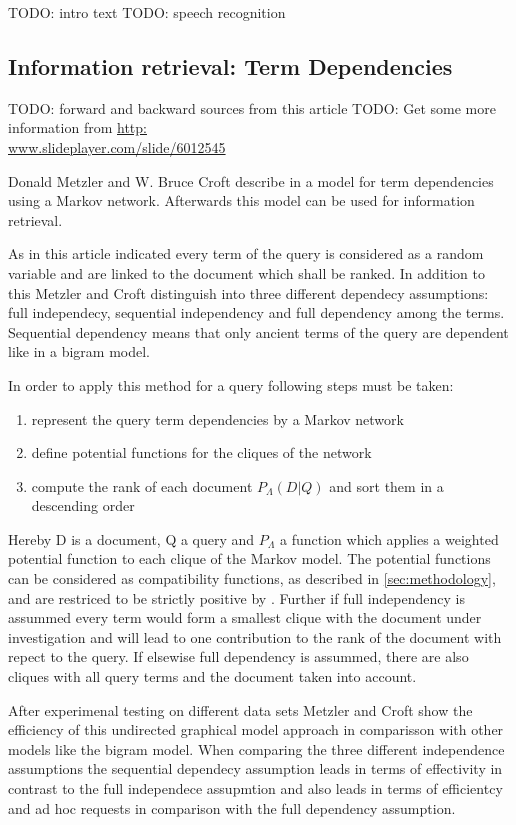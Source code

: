 TODO: intro text
TODO: speech recognition

\subsection{Information retrieval: Term Dependencies}

TODO: forward and backward sources from this article \cite{metzler2005markov}
TODO: Get some more information from \href{Slides for this topic}{http:\\www.slideplayer.com/slide/6012545}

Donald Metzler and W. Bruce Croft describe in \cite{metzler2005markov} a model for term dependencies using a Markov network. Afterwards this model can be used for information retrieval.

As in this article indicated every term of the query is considered as a random variable and are linked to the document which shall be ranked. In addition to this Metzler and Croft distinguish into three different dependecy assumptions: full independecy, sequential independency and full dependency among the terms. Sequential dependency means that only ancient terms of the query are dependent like in a bigram model.

In order to apply this method for a query following steps must be taken:
\begin{enumerate}
\item represent the query term dependencies by a Markov network
\item define potential functions for the cliques of the network
\item compute the rank of each document $P_\Lambda (D|Q)$ and sort them in a descending order
\end{enumerate}

Hereby D is a document, Q a query and $P_\Lambda$ a function which applies a weighted potential function to each clique of the Markov model. The potential functions can be considered as compatibility functions, as described in \ref{sec:methodology}, and are restriced to be strictly positive by \cite{metzler2005markov}. Further if full independency is assummed every term would form a smallest clique with the document under investigation and will lead to one contribution to the rank of the document with repect to the query. If elsewise full dependency is assummed, there are also cliques with all query terms and the document taken into account.

After experimenal testing on different data sets Metzler and Croft show the efficiency of this undirected graphical model approach in comparisson with other models like the bigram model. When comparing the three different independence assumptions the sequential dependecy assumption leads in terms of effectivity in contrast to the full independece assupmtion and also leads in terms of efficientcy and ad hoc requests in comparison with the full dependency assumption.


